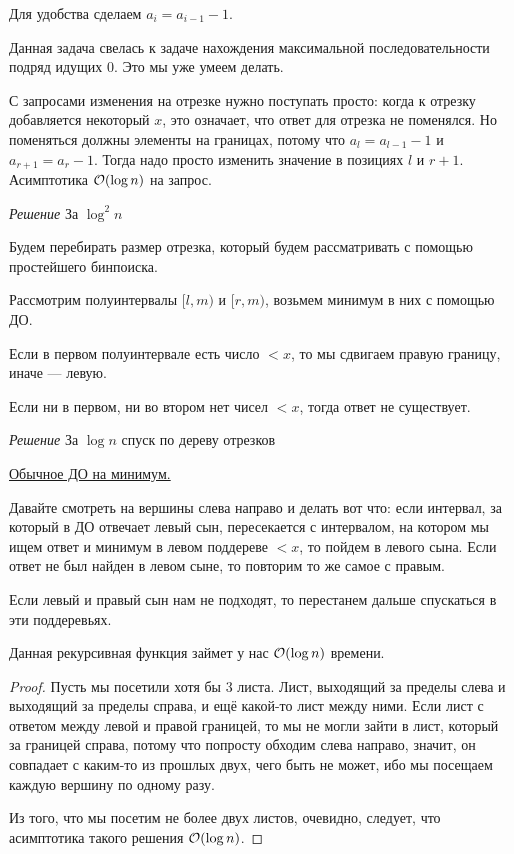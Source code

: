 Для удобства сделаем $a_i = a_{i - 1} - 1$.

Данная задача свелась к задаче нахождения максимальной последовательности подряд идущих $0$. Это мы уже умеем делать.

С запросами изменения на отрезке нужно поступать просто: когда к отрезку добавляется некоторый $x$, это означает, что ответ для отрезка не поменялся. Но поменяться должны элементы на границах, потому что $a_l = a_{l - 1} - 1$ и $a_{r + 1} = a_r - 1$. Тогда надо просто изменить значение в позициях $l$ и $r + 1$. Асимптотика $\mathcal{O}(\log n)$ на запрос.

\pagebreak


{\it Решение } За $\log^2 n$	

Будем перебирать размер отрезка, который будем рассматривать с помощью простейшего бинпоиска.

Рассмотрим полуинтервалы $[l, m)$ и $[r, m)$, возьмем минимум в них с помощью ДО.

Если в первом полуинтервале есть число $< x$, то мы сдвигаем правую границу, иначе --- левую.

Если ни в первом, ни во втором нет чисел $< x$, тогда ответ не существует.

\down

{\it Решение } За $\log n$ спуск по дереву отрезков

\href{https://codeforces.com/blog/entry/70625}{Обычное ДО на минимум.}

Давайте смотреть на вершины слева направо и делать вот что: если интервал, за который в ДО отвечает левый сын, пересекается с интервалом, на котором мы ищем ответ и минимум в левом поддереве $<x$, то пойдем в левого сына. Если ответ не был найден в левом сыне, то повторим то же самое с правым.

Если левый и правый сын нам не подходят, то перестанем дальше спускаться в эти поддеревьях.

\begin{Thm}\label{thm@splay}
	Данная рекурсивная функция займет у нас $\mathcal{O}(\log n)$ времени.
\end{Thm}

\begin{proof}
	Пусть мы посетили хотя бы 3 листа. Лист, выходящий за пределы слева и выходящий за пределы справа, и ещё какой-то лист между ними. Если лист с ответом между левой и правой границей, то мы не могли зайти в лист, который за границей справа, потому что попросту обходим слева направо, значит, он совпадает с каким-то из прошлых двух, чего быть не может, ибо мы посещаем каждую вершину по одному разу.
	
	Из того, что мы посетим не более двух листов, очевидно, следует, что асимптотика такого решения $\mathcal{O}(\log n)$.
\end{proof}


